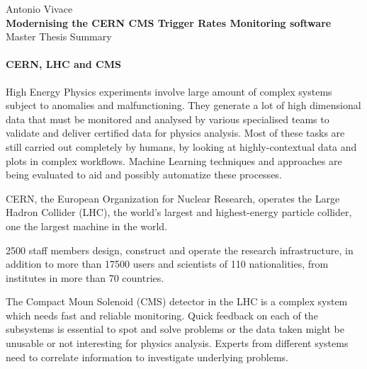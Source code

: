\documentclass[a4, oneside, 10pt, nobib]{memoir}
\begin{document}
\thispagestyle{empty}

\begin{center}

	{\Large Antonio Vivace}
	\\
	\vspace{8mm}
	{\Huge \textbf{Modernising the CERN CMS Trigger Rates Monitoring software}}
	\\
	\vspace{8mm}
	{\huge Master Thesis Summary}
\end{center}

\pagebreak
\setcounter{page}{1}

		\paragraph{CERN, LHC and CMS} High Energy Physics experiments involve large amount of complex systems subject to anomalies and malfunctioning. They generate a lot of high dimensional data that must be monitored and analysed by various specialised teams to validate and deliver certified data for physics analysis. Most of these tasks are still carried out completely by humans, by looking at highly-contextual data and plots in complex workflows. Machine Learning techniques and approaches are being evaluated to aid and possibly automatize these processes.

		CERN, the European Organization for Nuclear Research, operates the Large Hadron Collider (LHC), the world's largest and highest-energy particle collider, one the largest machine in the world.

		2500 staff members design, construct and operate the research infrastructure, in addition to more than 17500 users and scientists of 110 nationalities, from institutes in more than 70 countries.

		The Compact Moun Solenoid (CMS) detector in the LHC is a complex system which needs fast and reliable monitoring. Quick feedback on each of the subsystems is essential to spot and solve problems or the data taken might be unusable or not interesting for physics analysis. Experts from different systems need to correlate information to investigate underlying problems.
\end{document}
